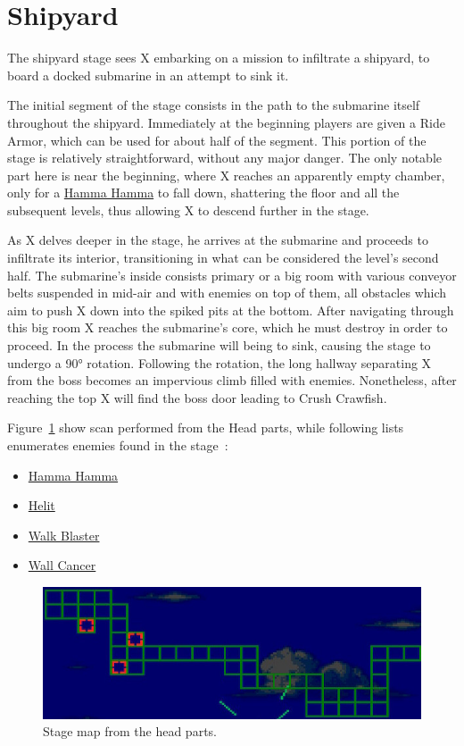 \section{Shipyard}
The shipyard stage sees X embarking on a mission to infiltrate a shipyard, to board a docked submarine in an attempt to sink it. 

The initial segment of the stage consists in the path to the submarine itself throughout the shipyard. Immediately at the beginning players are given a Ride Armor, which can be used for about half of the segment. This portion of the stage is relatively straightforward, without any major danger. The only notable part here is near the beginning, where X reaches an apparently empty chamber, only for a  \hyperlink{enem:Hamma_Hamma}{Hamma Hamma} to fall down, shattering the floor and all the subsequent levels, thus allowing X to descend further in the stage.

As X delves  deeper in the stage, he arrives at the submarine and proceeds to infiltrate its interior, transitioning in what can be considered the level's second half. The submarine's inside consists primary or a big room with various conveyor belts suspended in mid-air and with enemies on top of them, all obstacles which aim to push X down into the spiked pits at the bottom. After navigating through this big room X reaches the submarine's core, which he must destroy in order to proceed. In the process the submarine will being to sink, causing the stage to undergo a 90° rotation. Following the rotation, the long hallway separating X from the boss becomes an impervious climb filled with enemies. Nonetheless, after reaching the top X will find the boss door leading to Crush Crawfish.

Figure~\ref{fig:Shipyard_map} show scan performed from the Head parts, while following lists enumerates enemies found in the stage~\cite{wiki:Shipyard}:
\begin{itemize}
	\item \hyperlink{enem:Hamma_Hamma}{Hamma Hamma}
	\item \hyperlink{enem:Helit}{Helit}
	\item \hyperlink{enem:Walk_Blaster}{Walk Blaster}
	\item \hyperlink{enem:Wall_cancer}{Wall Cancer}
\end{itemize}

\begin{figure}[htp]
	\centering
	\includegraphics[width=.7\linewidth]{figures/X3/Crush_crawfish/map.jpg}
	\caption{Stage map from the head parts.}
	\label{fig:Shipyard_map}
\end{figure}

